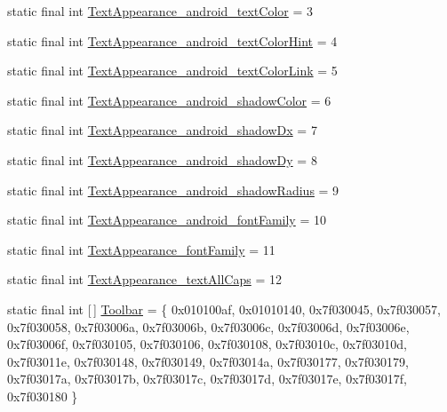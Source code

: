 \begin{DoxyCompactItemize}
static final int \mbox{\hyperlink{classandroid_1_1support_1_1v7_1_1appcompat_1_1R_1_1styleable_ae130f82b90e33686295a03d11aa6c62f}{Text\+Appearance\+\_\+android\+\_\+text\+Color}} = 3
\item 
static final int \mbox{\hyperlink{classandroid_1_1support_1_1v7_1_1appcompat_1_1R_1_1styleable_a95f007124181f7ae3915214f019838d8}{Text\+Appearance\+\_\+android\+\_\+text\+Color\+Hint}} = 4
\item 
static final int \mbox{\hyperlink{classandroid_1_1support_1_1v7_1_1appcompat_1_1R_1_1styleable_ac3a38a44b54e082404e5631714be5d8c}{Text\+Appearance\+\_\+android\+\_\+text\+Color\+Link}} = 5
\item 
static final int \mbox{\hyperlink{classandroid_1_1support_1_1v7_1_1appcompat_1_1R_1_1styleable_a639281e0d04325662d3d57c7802f03de}{Text\+Appearance\+\_\+android\+\_\+shadow\+Color}} = 6
\item 
static final int \mbox{\hyperlink{classandroid_1_1support_1_1v7_1_1appcompat_1_1R_1_1styleable_a6b1a196edd622828d89fd8707d72b8c7}{Text\+Appearance\+\_\+android\+\_\+shadow\+Dx}} = 7
\item 
static final int \mbox{\hyperlink{classandroid_1_1support_1_1v7_1_1appcompat_1_1R_1_1styleable_a6c2a7060369b3c30927869484c276444}{Text\+Appearance\+\_\+android\+\_\+shadow\+Dy}} = 8
\item 
static final int \mbox{\hyperlink{classandroid_1_1support_1_1v7_1_1appcompat_1_1R_1_1styleable_a96bc2f9cacb559966fb2cc7c9ba2eeec}{Text\+Appearance\+\_\+android\+\_\+shadow\+Radius}} = 9
\item 
static final int \mbox{\hyperlink{classandroid_1_1support_1_1v7_1_1appcompat_1_1R_1_1styleable_a67396fb188140e0272669ea81f820da8}{Text\+Appearance\+\_\+android\+\_\+font\+Family}} = 10
\item 
static final int \mbox{\hyperlink{classandroid_1_1support_1_1v7_1_1appcompat_1_1R_1_1styleable_a8e1fac3690f459c9a021da32eb050d39}{Text\+Appearance\+\_\+font\+Family}} = 11
\item 
static final int \mbox{\hyperlink{classandroid_1_1support_1_1v7_1_1appcompat_1_1R_1_1styleable_af8c701cb6175c8b9e88e66d3cd60ed12}{Text\+Appearance\+\_\+text\+All\+Caps}} = 12
\item 
static final int \mbox{[}$\,$\mbox{]} \mbox{\hyperlink{classandroid_1_1support_1_1v7_1_1appcompat_1_1R_1_1styleable_a2daba9587ef9f700f2d54cf13435cb32}{Toolbar}} = \{ 0x010100af, 0x01010140, 0x7f030045, 0x7f030057, 0x7f030058, 0x7f03006a, 0x7f03006b, 0x7f03006c, 0x7f03006d, 0x7f03006e, 0x7f03006f, 0x7f030105, 0x7f030106, 0x7f030108, 0x7f03010c, 0x7f03010d, 0x7f03011e, 0x7f030148, 0x7f030149, 0x7f03014a, 0x7f030177, 0x7f030179, 0x7f03017a, 0x7f03017b, 0x7f03017c, 0x7f03017d, 0x7f03017e, 0x7f03017f, 0x7f030180 \}

\end{DoxyCompactItemize}
